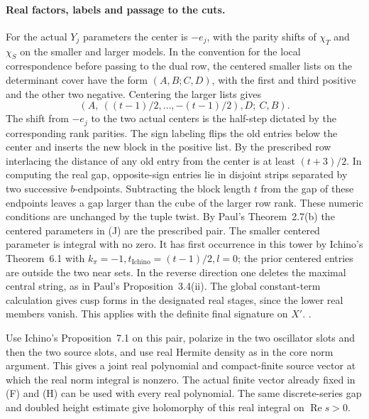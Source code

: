 \paragraph{Real factors, labels and passage to the cuts.}
For the actual \(Y_j\) parameters the center is
\(-e_j\), with the parity shifts of \(\chi_T\) and
\(\chi_S\) on the smaller and larger models. In the
convention for the local correspondence before
passing to the dual row, the centered smaller lists
on the determinant cover have
the form \((A,B;C,D)\), with the first and third
positive and the other two negative. Centering the
larger lists gives
\[
 (A,\ ((t-1)/2,\ldots,-(t-1)/2),D;\ C,B).
 \tag{J}
\]
The shift from \(-e_j\) to the two actual centers
is the half-step dictated by the corresponding rank
parities. The sign labeling flips the old entries
below the center and inserts the new block in the
positive list. By the prescribed row interlacing the
distance of any old entry from the center is at least
\((t+3)/2\). In computing the real gap, opposite-sign
entries lie in disjoint strips separated by two successive
\(b\)-endpoints. Subtracting the block length \(t\)
from the gap of these endpoints leaves a gap larger
than the cube of the larger row rank. These numeric
conditions are unchanged by the tuple twist. By Paul's
Theorem~2.7(b) the centered parameters in (J) are the
prescribed pair. The smaller centered parameter is
integral with no zero. It has first occurrence in this
tower by Ichino's Theorem~6.1 with
\(k_\pi=-1,t_{\mathrm{Ichino}}=(t-1)/2,l=0\);
the prior centered entries are outside the two near
sets. In the reverse direction one deletes the maximal
central string, as in Paul's Proposition~3.4(ii).
The global constant-term calculation gives cusp forms
in the designated real stages, since the lower real
members vanish. This applies with the definite final
signature on \(X'\).
.

Use Ichino's Proposition~7.1 on this pair, polarize
in the two oscillator slots and then the two source
slots, and use real Hermite density as in the core
norm argument. This gives a joint real polynomial and
compact-finite source vector at which the real norm
integral is nonzero. The actual finite vector already
fixed in (F) and (H) can be used with every real
polynomial. The same discrete-series gap and doubled
height estimate give holomorphy of this real integral
on \(\operatorname{Re}s>0\).

